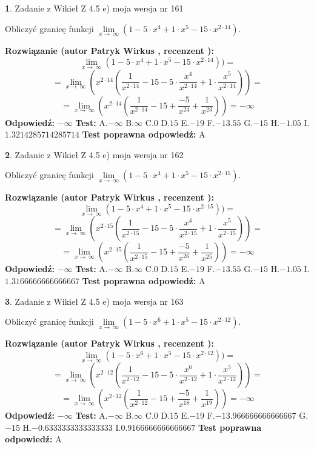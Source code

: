\documentclass[12pt, a4paper]{article}
\theoremstyle{definition} %
\newtheorem{zad}{}
\newcommand{\zadStart}[1]{\begin{zad}#1\newline}
\newcommand{\zadStop}{\end{zad}}
\newcommand{\rozwStart}[2]{\noindent \textbf{Rozwiązanie (autor #1 , recenzent #2): }\newline}
\newcommand{\rozwStop}{\newline}
\newcommand{\odpStart}{\noindent \textbf{Odpowiedź:}\newline}
\newcommand{\odpStop}{\newline}
\newcommand{\testStart}{\noindent \textbf{Test:}\newline}
\newcommand{\testStop}{\newline}
\newcommand{\kluczStart}{\noindent \textbf{Test poprawna odpowiedź:}\newline}
\newcommand{\kluczStop}{\newline}
\begin{document}
\zadStart{Zadanie z Wikieł Z 4.5 e) moja wersja nr 161}


Obliczyć granicę funkcji  $\lim\limits_{x\to\ \infty}(1 - 5 \cdot x^{4}+1 \cdot x^{5}- 15 \cdot x^{2\cdot14})$.
\zadStop
\rozwStart{Patryk Wirkus}{}
$$\lim\limits_{x\to\ \infty}(1 - 5 \cdot x^{4}+1 \cdot x^{5}- 15 \cdot x^{2\cdot14}))=$$
$$=\lim\limits_{x\to\ \infty}(x^{2\cdot14}(\frac{1}{x^{2\cdot14}}-15 -5 \cdot \frac{x^{4}}{x^{2\cdot14}}+1 \cdot \frac{x^{5}}{x^{2\cdot14}}))=$$
$$=\lim\limits_{x\to\ \infty}(x^{2\cdot14}(\frac{1}{x^{2\cdot14}}-15 + \frac{-5}{x^{24}}+ \frac{1}{x^{23}}))=-\infty$$
\rozwStop
\odpStart
$-\infty$
\odpStop
\testStart
A.$-\infty$ B.$\infty$ C.$0$ D.$15$ E.$-19$
F.$-13.55$ G.$-15$
H.$-1.05$
I.$1.3214285714285714$
\testStop
\kluczStart
A
\kluczStop



\zadStart{Zadanie z Wikieł Z 4.5 e) moja wersja nr 162}


Obliczyć granicę funkcji  $\lim\limits_{x\to\ \infty}(1 - 5 \cdot x^{4}+1 \cdot x^{5}- 15 \cdot x^{2\cdot15})$.
\zadStop
\rozwStart{Patryk Wirkus}{}
$$\lim\limits_{x\to\ \infty}(1 - 5 \cdot x^{4}+1 \cdot x^{5}- 15 \cdot x^{2\cdot15}))=$$
$$=\lim\limits_{x\to\ \infty}(x^{2\cdot15}(\frac{1}{x^{2\cdot15}}-15 -5 \cdot \frac{x^{4}}{x^{2\cdot15}}+1 \cdot \frac{x^{5}}{x^{2\cdot15}}))=$$
$$=\lim\limits_{x\to\ \infty}(x^{2\cdot15}(\frac{1}{x^{2\cdot15}}-15 + \frac{-5}{x^{26}}+ \frac{1}{x^{25}}))=-\infty$$
\rozwStop
\odpStart
$-\infty$
\odpStop
\testStart
A.$-\infty$ B.$\infty$ C.$0$ D.$15$ E.$-19$
F.$-13.55$ G.$-15$
H.$-1.05$
I.$1.3166666666666667$
\testStop
\kluczStart
A
\kluczStop



\zadStart{Zadanie z Wikieł Z 4.5 e) moja wersja nr 163}


Obliczyć granicę funkcji  $\lim\limits_{x\to\ \infty}(1 - 5 \cdot x^{6}+1 \cdot x^{5}- 15 \cdot x^{2\cdot12})$.
\zadStop
\rozwStart{Patryk Wirkus}{}
$$\lim\limits_{x\to\ \infty}(1 - 5 \cdot x^{6}+1 \cdot x^{5}- 15 \cdot x^{2\cdot12}))=$$
$$=\lim\limits_{x\to\ \infty}(x^{2\cdot12}(\frac{1}{x^{2\cdot12}}-15 -5 \cdot \frac{x^{6}}{x^{2\cdot12}}+1 \cdot \frac{x^{5}}{x^{2\cdot12}}))=$$
$$=\lim\limits_{x\to\ \infty}(x^{2\cdot12}(\frac{1}{x^{2\cdot12}}-15 + \frac{-5}{x^{18}}+ \frac{1}{x^{19}}))=-\infty$$
\rozwStop
\odpStart
$-\infty$
\odpStop
\testStart
A.$-\infty$ B.$\infty$ C.$0$ D.$15$ E.$-19$
F.$-13.966666666666667$ G.$-15$
H.$-0.6333333333333333$
I.$0.9166666666666667$
\testStop
\kluczStart
A
\kluczStop
\end{document}
